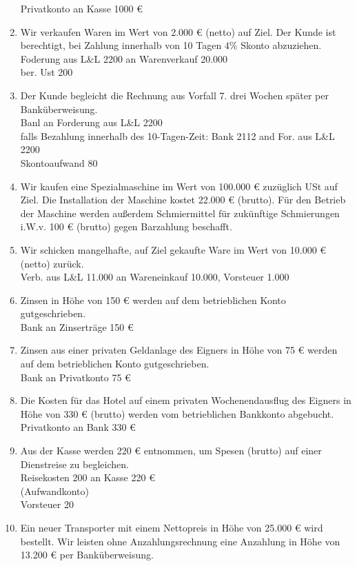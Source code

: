 \documentclass[paper=a4, fontsize=11pt]{scrartcl}
\numberwithin{equation}{section}
\numberwithin{figure}{section}
\numberwithin{table}{section}
\begin{document}
\begin{enumerate}
Privatkonto an Kasse 1000 €
\item Wir verkaufen Waren im Wert von 2.000 € (netto) auf Ziel. Der Kunde ist berechtigt, bei Zahlung innerhalb von 10 Tagen $4 \%$ Skonto abzuziehen. \\

Foderung aus L\&L 2200 an Warenverkauf 20.000 \\
ber. Ust 200
\item Der Kunde begleicht die Rechnung aus Vorfall 7. drei Wochen später per Banküberweisung. \\

Banl an Forderung aus L\&L 2200 \\
falls Bezahlung innerhalb des 10-Tagen-Zeit: Bank 2112 and For. aus L\&L 2200\\
Skontoaufwand 80
\item Wir kaufen eine Spezialmaschine im Wert von 100.000 € zuzüglich USt auf Ziel. Die Installation der Maschine kostet 22.000 € (brutto). Für den Betrieb der Maschine werden außerdem Schmiermittel für zukünftige Schmierungen i.W.v. 100 € (brutto) gegen Barzahlung beschafft. 
\item Wir schicken mangelhafte, auf Ziel gekaufte Ware im Wert von 10.000 € (netto) zurück.  \\

Verb. aus L\&L 11.000 an Wareneinkauf 10.000, Vorsteuer 1.000
\item Zinsen in Höhe von 150 € werden auf dem betrieblichen Konto gutgeschrieben. \\

Bank an Zinserträge 150 €
\item Zinsen aus einer privaten Geldanlage des Eigners in Höhe von 75 € werden auf dem betrieblichen Konto gutgeschrieben. \\

Bank an Privatkonto 75 €
\item Die Kosten für das Hotel auf einem privaten Wochenendausflug des Eigners in Höhe von 330 € (brutto) werden vom betrieblichen Bankkonto abgebucht. \\

Privatkonto an Bank 330 €
\item Aus der Kasse werden 220 € entnommen, um Spesen (brutto) auf einer Dienstreise zu begleichen. \\

Reisekosten 200 an Kasse 220 € \\
(Aufwandkonto) \\
Vorsteuer 20
\item Ein neuer Transporter mit einem Nettopreis in Höhe von 25.000 € wird bestellt. Wir leisten ohne Anzahlungsrechnung eine Anzahlung in Höhe von 13.200 € per Banküberweisung. \\


\end{enumerate}
\end{document}
